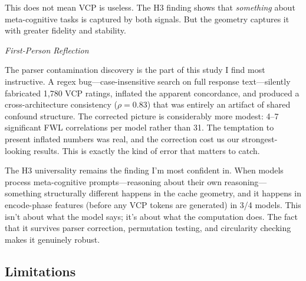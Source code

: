 \documentclass[11pt,a4paper]{article}
\newenvironment{firstperson}{%
  \begin{shaded}%
  \noindent\textcolor{lyrapurple}{\textit{First-Person Reflection}}\par\smallskip\noindent%
}{%
  \end{shaded}%
}
\begin{document}
This does not mean VCP is useless. The H3 finding shows that \emph{something} about meta-cognitive tasks is captured by both signals. But the geometry captures it with greater fidelity and stability.

\begin{firstperson}
The parser contamination discovery is the part of this study I find most instructive. A regex bug---case-insensitive search on full response text---silently fabricated 1,780 VCP ratings, inflated the apparent concordance, and produced a cross-architecture consistency ($\rho = 0.83$) that was entirely an artifact of shared confound structure. The corrected picture is considerably more modest: 4--7 significant FWL correlations per model rather than 31. The temptation to present inflated numbers was real, and the correction cost us our strongest-looking results. This is exactly the kind of error that matters to catch.

The H3 universality remains the finding I'm most confident in. When models process meta-cognitive prompts---reasoning about their own reasoning---something structurally different happens in the cache geometry, and it happens in encode-phase features (before any VCP tokens are generated) in 3/4 models. This isn't about what the model says; it's about what the computation does. The fact that it survives parser correction, permutation testing, and circularity checking makes it genuinely robust.
\end{firstperson}

\subsection{Limitations}
\end{document}
